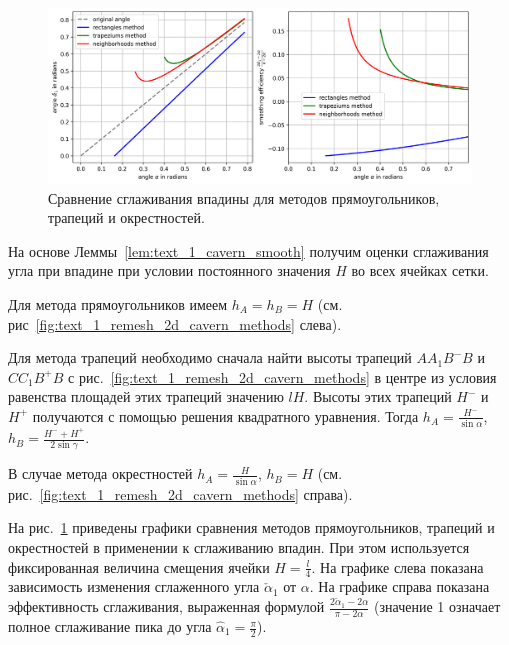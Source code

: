 \documentclass[
11pt,%
tightenlines,%
twoside,%
onecolumn,%
nofloats,%
nobibnotes,%
nofootinbib,%
superscriptaddress,%
noshowpacs,%
centertags]%
{revtex4}
\begin{document}
\begin{figure}[ht]
\setcaptionmargin{5mm}
\onelinecaptionstrue  %
\includegraphics[width=1.0\textwidth]{./pics/cavern-methods-chart.png}
\caption{Сравнение сглаживания впадины для методов прямоугольников, трапеций и окрестностей.}
\label{fig:text_1_remesh_2d_cavern_methods_chart}
\end{figure}

На основе Леммы~\ref{lem:text_1_cavern_smooth} получим оценки сглаживания угла при впадине при условии постоянного значения $H$ во всех ячейках сетки.

Для метода прямоугольников имеем $h_A = h_B = H$ (см. рис~\ref{fig:text_1_remesh_2d_cavern_methods} слева).

Для метода трапеций необходимо сначала найти высоты трапеций $AA_1B^{-}B$ и $CC_1B^{+}B$ с рис.~\ref{fig:text_1_remesh_2d_cavern_methods} в центре из условия равенства площадей этих трапеций значению $lH$.
Высоты этих трапеций $H^{-}$ и $H^{+}$ получаются с помощью решения квадратного уравнения.
Тогда $h_A = \frac{H^{-}}{\sin \alpha}$, $h_B = \frac{H^{-} + H^{+}}{2 \sin \gamma}$.

В случае метода окрестностей $h_A = \frac{H}{\sin \alpha}$,  $h_B = H$ (см. рис.~\ref{fig:text_1_remesh_2d_cavern_methods} справа).

На рис.~\ref{fig:text_1_remesh_2d_cavern_methods_chart} приведены графики сравнения методов прямоугольников, трапеций и окрестностей в применении к сглаживанию впадин.
При этом используется фиксированная величина смещения ячейки $H = \frac{l}{4}$.
На графике слева показана зависимость изменения сглаженного угла $\check{\alpha}_1$ от $\alpha$.
На графике справа показана эффективность сглаживания, выраженная формулой $\frac{2 \check{\alpha}_1 - 2 \alpha}{\pi - 2 \alpha}$ (значение 1 означает полное сглаживание пика до угла $\hat{\alpha}_1 = \frac{\pi}{2}$).
\end{document}
